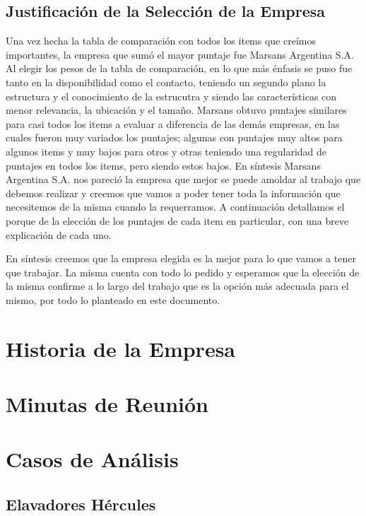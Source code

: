 \documentclass[12pt,a4paper,spanish]{article}
\begin{document}
\subsection{Justificaci\'{o}n de la Selecci\'{o}n de la Empresa}

Una vez hecha la tabla de comparaci\'{o}n con todos los items que cre\'imos importantes, la empresa que sum\'o el mayor puntaje fue Marsans Argentina S.A.
Al elegir los pesos de la tabla de comparaci\'{o}n, en lo que m\'as \'enfasis se puso fue tanto en la disponibilidad como el contacto, teniendo un segundo plano la estructura y el conocimiento de la estrucutra y siendo las caracter\'isticas con menor relevancia, la ubicaci\'on y el tama\~no.
Marsans obtuvo puntajes similares para casi todos los items a evaluar a diferencia de las dem\'{a}s empresas, en las cuales fueron muy variados los puntajes; algunas con puntajes muy altos para algunos items y muy bajos para otros y otras teniendo una regularidad de puntajes en todos los items, pero siendo estos bajos.
En s\'{i}ntesis Marsans Argentina S.A. nos pareci\'{o} la empresa que mejor se puede amoldar al trabajo que debemos realizar y creemos que vamos a poder tener toda la informaci\'{o}n que necesitemos de la misma cuando la requerramos.
A continuaci\'{o}n detallamos el porque de la elecci\'{o}n de los puntajes de cada item en particular, con una breve explicaci\'{o}n de cada uno.


En s\'{i}ntesis creemos que la empresa elegida es la mejor para lo que vamos a tener que trabajar. La misma cuenta con todo lo pedido y esperamos que la elecci\'{o}n de la misma confirme a lo largo del trabajo que es la opci\'on m\'as adecuada para el mismo, por todo lo planteado en este documento.

\section{Historia de la Empresa}
\section{Minutas de Reuni\'{o}n}
\section{Casos de An\'{a}lisis}
\subsection{Elavadores H\'{e}rcules}
\end{document}
